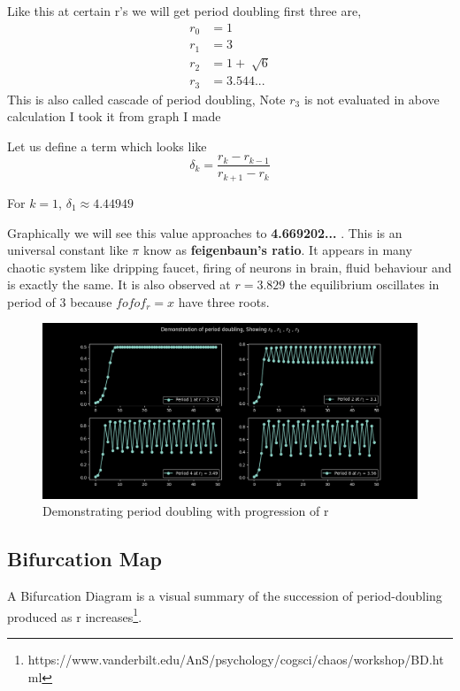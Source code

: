 \documentclass{report}
\begin{document}
Like this at certain r's we will get period doubling first three are,
\begin{align}
    r_0 &= 1 \nonumber \\
    r_1 &= 3 \nonumber \\
    r_2 &= 1 + \sqrt[]{6} \nonumber \\
    r_3 &= 3.544... \nonumber
\end{align}
This is also called cascade of period doubling, Note  $r_3$ is not evaluated in above calculation I took it from graph I made

Let us define a term which looks like
\begin{equation}
    \delta_k = \frac{r_k - r_{k-1}}{r_{k+1} - r_k}
\end{equation}

For $k = 1$, $\delta_1 \approx 4.44949$ \newline

Graphically we will see this value approaches to \textbf{4.669202...} . This is an universal constant like $\pi$ know as \textbf{feigenbaun's ratio}. It appears in many chaotic system like dripping faucet, firing of neurons in brain, fluid behaviour and is exactly the same.
It is also observed at $r = 3.829$ the equilibrium oscillates in period of 3 because $fofof_r = x$ have three roots. \newline

\begin{figure}[!h]
    \centering
    \includegraphics[scale=.45]{images/period2ing.png}
    \caption{Demonstrating period doubling with progression of r}
    \label{fig:my_label3}
\end{figure}

\subsection{Bifurcation Map}
\raggedright
A Bifurcation Diagram is a visual summary of the succession of period-doubling produced as r increases\footnote[1]{https://www.vanderbilt.edu/AnS/psychology/cogsci/chaos/workshop/BD.html}.
\end{document}
